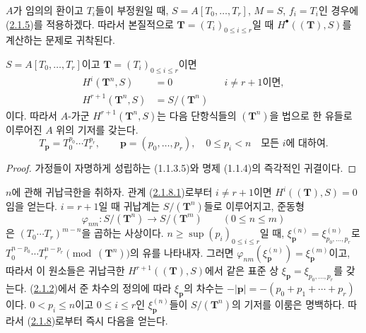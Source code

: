 \begin{env}[2.1.7]
\label{III.2.1.7-fr}
$A$가 임의의 환이고 $T_i$들이 부정원일 때,
$S=A[T_0,\ldots,T_r]$, $M=S$, $f_i=T_i$인 경우에
(\hyperref[III.2.1.5-fr]{2.1.5})를 적용하겠다. 따라서 본질적으로
$\mathbf T=(T_i)_{0\leq i\leq r}$일 때
$H^\bullet((\mathbf T),S)$를 계산하는 문제로 귀착된다.
\end{env}

\begin{lemma}[2.1.8]
\label{III.2.1.8-fr}
$S=A[T_0,\ldots,T_r]$이고 $\mathbf T=(T_i)_{0\leq i\leq r}$이면
\begin{align}
\label{III.2.1.8.1-fr}
\tag{2.1.8.1}
H^i(\mathbf T^n,S)&=0 &&\text{$i\neq r+1$이면},\\
\label{III.2.1.8.2-fr}
\tag{2.1.8.2}
H^{r+1}(\mathbf T^n,S)&=S/(\mathbf T^n)
\end{align}
이다. 따라서 $A$-가군 $H^{r+1}(\mathbf T^n,S)$는 다음 단항식들의
$(\mathbf T^n)$을 법으로 한 유들로 이루어진 $A$ 위의 기저를 갖는다.
\[
T_{\mathbf p}=T_0^{p_0}\cdots T_r^{p_r},
\qquad \mathbf p=(p_0,\ldots,p_r),\quad 0\leq p_i<n
\quad\text{모든 }i\text{에 대하여}.
\]
\end{lemma}

\begin{proof}
가정들이 자명하게 성립하는 (1.1.3.5)와 명제 (1.1.4)의 즉각적인
귀결이다.
\end{proof}

\begin{env}[2.1.9]
\label{III.2.1.9-fr}
$n$에 관해 귀납극한을 취하자. 관계
(\hyperref[III.2.1.8.1-fr]{2.1.8.1})로부터 $i\neq r+1$이면
$H^i((\mathbf T),S)=0$임을 얻는다. $i=r+1$일 때 귀납계는
$S/(\mathbf T^n)$들로 이루어지고, 준동형
\[
\varphi_{nm}:S/(\mathbf T^n)\longrightarrow S/(\mathbf T^m)
\qquad(0\leq n\leq m)
\]
은 $(T_0\cdots T_r)^{m-n}$을 곱하는 사상이다.
$n\geq\sup(p_i)_{0\leq i\leq r}$일 때,
$\xi_{\mathbf p}^{(n)}=\xi_{p_0,\ldots,p_r}^{(n)}$로
$T_0^{n-p_0}\cdots T_r^{n-p_r}\pmod{(\mathbf T^n)}$의 유를 나타내자.
그러면 $\varphi_{nm}(\xi_{\mathbf p}^{(n)})
=\xi_{\mathbf p}^{(m)}$이고, 따라서 이 원소들은 귀납극한
$H^{r+1}((\mathbf T),S)$에서 같은 표준 상
$\xi_{\mathbf p}=\xi_{p_0,\ldots,p_r}$를 갖는다.
(\hyperref[III.2.1.2-fr]{2.1.2})에서 준 차수의 정의에 따라
$\xi_{\mathbf p}$의 차수는
$-|\mathbf p|=-(p_0+p_1+\cdots+p_r)$이다. $0<p_i\leq n$이고
$0\leq i\leq r$인 $\xi_{\mathbf p}^{(n)}$들이
$S/(\mathbf T^n)$의 기저를 이룸은 명백하다. 따라서
(\hyperref[III.2.1.8-fr]{2.1.8})로부터 즉시 다음을 얻는다.
\end{env}


